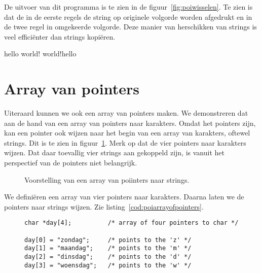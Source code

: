 De uitvoer van dit programma is te zien in de figuur~\ref{fig:poiwisselen}. Te zien is dat de in de eerste regels de string op originele volgorde worden afgedrukt en in de twee regel in omgekeerde volgorde. Deze manier van herschikken van strings is veel efficiënter dan strings kopiëren.

\begin{dosbox}[title=Verwisselen van twee stings.,label=fig:poiwisselen]
hello world!
world!hello
\end{dosbox}


\section{Array van pointers}
Uiteraard kunnen we ook een array van pointers maken. We demonstreren dat aan de hand van een array van pointers naar karakters. Omdat het pointers zijn, kan een pointer ook wijzen naar het begin van een array van karakters, oftewel strings. Dit is te zien in figuur~\ref{fig:poiarrayofpointers}. Merk op dat de vier pointers naar karakters wijzen. Dat daar toevallig vier strings aan gekoppeld zijn, is vanuit het perspectief van de pointers niet belangrijk.

\begin{figure}[!ht]
\centering
{}
\caption{Voorstelling van een array van poiinters naar strings.}
\label{fig:poiarrayofpointers}
\end{figure}

We definiëren een array van vier pointers naar karakters. Daarna laten we de pointers naar strings wijzen. Zie listing~\ref{cod:poiarrayofpointers}.

\begin{figure}[!ht]
\begin{lstlisting}[caption=Een array van pointers.,label=cod:poiarrayofpointers]
char *day[4];          /* array of four pointers to char */

day[0] = "zondag";     /* points to the 'z' */
day[1] = "maandag";    /* points to the 'm' */
day[2] = "dinsdag";    /* points to the 'd' */
day[3] = "woensdag";   /* points to the 'w' */
\end{lstlisting}
\end{figure}

